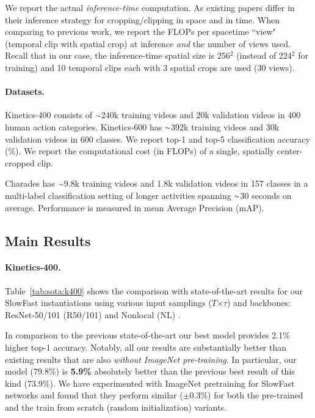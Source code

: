 \documentclass[10pt,twocolumn,letterpaper]{article}
\newcommand{\tblref}[1]{Table~\ref{#1}}
\newcommand{\app}{\raise.17ex\hbox{$\scriptstyle\sim$}}
\def\x{$\times$}
\begin{document}
	We report the actual \emph{inference-time} computation. As {existing papers differ in their inference strategy for cropping/clipping in space and in time}. When comparing to previous work, we report the FLOPs per spacetime ``view" (temporal clip with spatial crop) at inference \emph{and} the number of views used. Recall that in our case, the inference-time spatial size is 256$^2$ (instead of 224$^2$ for training) and 10 temporal clips each with 3 spatial crops are used (30 views).

	\paragraph{Datasets.} Kinetics-400 \cite{Kay2017} consists of $\app$240k training videos and 20k validation videos in 400 human action categories.
Kinetics-600 \cite{Carreira2018} has $\app$392k training videos and 30k validation videos in 600 classes. 
We report top-1 and top-5 classification accuracy (\%). We report the computational cost (in FLOPs) of a single, spatially center-cropped clip.
	
	Charades \cite{Sigurdsson2016} has $\app$9.8k training videos and 1.8k validation videos in 157 classes in a multi-label classification setting of longer activities spanning $\app$30 seconds on average. Performance is measured in mean Average Precision (mAP).
	
	\subsection{Main Results}
		
\paragraph{Kinetics-400.} \tblref{tab:sota:k400} shows the comparison with state-of-the-art results for our SlowFast instantiations using various input samplings ($T$\x$\tau$) and backbones: ResNet-50/101 (R50/101) \cite{He2016} and Nonlocal (NL) \cite{Wang2018}.

	In comparison to the previous state-of-the-art \cite{Wang2018} our best  model provides 2.1\% higher top-1 accuracy. 
	Notably, all our results are substantially better than existing results that are also \emph{without ImageNet pre-training}. In particular, our model (79.8\%) is \textbf{5.9\%} absolutely better than the previous best result of this kind (73.9\%). We have experimented with ImageNet pretraining for SlowFast networks and found that they perform similar ($\pm$0.3\%) for both the pre-trained and the train from scratch (random initialization) variants.
	
\end{document}
